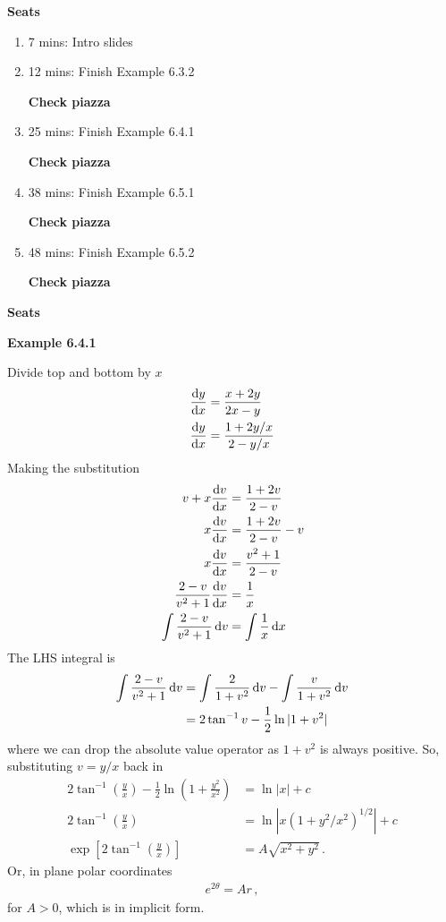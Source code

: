 \textbf{Seats}
\begin{enumerate}
    \item 7 mins: Intro slides \par
    \item 12 mins: Finish Example 6.3.2 \par
    \textbf{Check piazza}
    \item 25 mins: Finish Example 6.4.1 \par
    \textbf{Check piazza}
    \item 38 mins: Finish Example 6.5.1 \par
    \textbf{Check piazza}
    \item 48 mins: Finish Example 6.5.2 \par
    \textbf{Check piazza}
\end{enumerate}
\textbf{Seats}

\vspace{10mm}
\textbf{Example 6.4.1}

Divide top and bottom by $x$
\begin{align*}
\frac{{\rm d} y}{{\rm d} x} &= \frac{x+2y}{2x-y} \\
\frac{{\rm d} y}{{\rm d} x} &= \frac{1+2y/x}{2-y/x}
\end{align*}
Making the substitution
\begin{align*}
v + x \frac{{\rm d} v}{{\rm d} x} &= \frac{1+2v}{2-v} \\
 x \frac{{\rm d} v}{{\rm d} x} &=  \frac{1+2v}{2-v} - v \\
 x \frac{{\rm d} v}{{\rm d} x} &= \frac{v^2 + 1}{2-v} \\
 \frac{2-v}{v^2 + 1} \frac{{\rm d} v}{{\rm d} x} &= \frac{1}{x} \\
 \int  \frac{2-v}{v^2 + 1} \, {\rm d} v &= \int  \frac{1}{x} \, {\rm d} x \\
\end{align*}
The LHS integral is
\begin{align*}
	 \int  \frac{2-v}{v^2 + 1} \, {\rm d} v &= \int \frac{2}{1 + v^2}  \, {\rm d} v - \int  \frac{v}{1 + v^2}  \, {\rm d} v \\
	 &= 2\tan^{-1} v - \frac{1}{2} \ln |1 + v^2|
\end{align*}
where we can drop the absolute value operator as $1 + v^2$ is always positive. So, substituting $v=y/x$ back in
\begin{align*}
	2\tan^{-1} \left(\frac{y}{x}\right) - \frac{1}{2} \ln \left(1 + \frac{y^2}{x^2}\right) &= \ln|x| + c \\
	2\tan^{-1} \left(\frac{y}{x}\right) &= \ln \left| x(1 + y^2/x^2)^{1/2} \right| + c \\
	\exp\left[2 \tan^{-1} \left(\frac{y}{x}\right)\right] &= A\sqrt{x^2 + y^2} \, .
\end{align*}
Or, in plane polar coordinates
\begin{align*}
	e^{2\theta} = Ar \, ,
\end{align*}
for $A > 0$, which is in implicit form.

